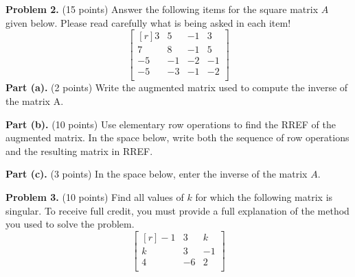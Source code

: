 \documentclass[12pt]{article}
\begin{document}
\clearpage


\textbf{Problem 2.} (15 points) Answer the following items for the square matrix $A$ given below. Please read carefully what is being asked in each item!
\[
\begin{bmatrix*}[r]3&5&-1&3\\7&8&-1&5\\-5&-1&-2&-1\\-5&-3&-1&-2\\\end{bmatrix*}
\]
\textbf{Part (a).} (2 points) Write the augmented matrix used to compute the inverse of the matrix A.

\vskip1.5in

\textbf{Part (b).} (10 points) Use elementary row operations to find the RREF of the augmented matrix.
In the space below, write both the sequence of row operations and the resulting matrix in RREF.

\vskip3.5in

\textbf{Part (c).} (3 points) In the space below, enter the inverse of the matrix $A$.

\clearpage

\textbf{Problem 3.} (10 points) Find all values of $k$ for which the following matrix is singular. To receive full credit, you must provide a full explanation of the method you used to solve the problem.
\[
\begin{bmatrix*}[r]-1&3&k\\k&3&-1\\4&-6&2\\\end{bmatrix*}
\]

\clearpage
\end{document}
